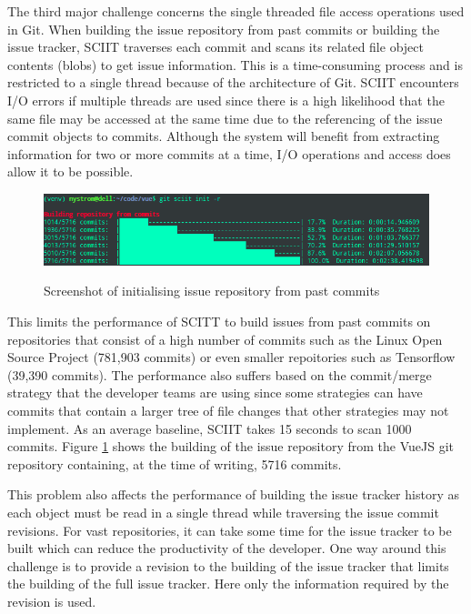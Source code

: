 \documentclass{mproj}
\begin{document}
The third major challenge concerns the single threaded file access operations used in Git. When building the issue repository from past commits or building the issue tracker, SCIIT traverses each commit and scans its related file object contents (blobs) to get issue information. This is a time-consuming process and is restricted to a single thread because of the architecture of Git. SCIIT encounters I/O errors if multiple threads are used since there is a high likelihood that the same file may be accessed at the same time due to the referencing of the issue commit objects to commits. Although the system will benefit from extracting information for two or more commits at a time, I/O operations and access does allow it to be possible. 

\begin{figure}[t]
\centering
  \caption{Screenshot of initialising issue repository from past commits}
  \includegraphics[width=14cm]{sciit-init}
  \label{fig:sciit-init}
\end{figure}

This limits the performance of SCITT to build issues from past commits on repositories that consist of a high number of commits such as the Linux Open Source Project (781,903 commits) or even smaller repoitories such as Tensorflow (39,390 commits). The performance also suffers based on the commit/merge strategy that the developer teams are using since some strategies can have commits that contain a larger tree of file changes that other strategies may not implement. As an average baseline, SCIIT takes 15 seconds to scan 1000 commits. Figure \ref{fig:sciit-init} shows the building of the issue repository from the VueJS git repository containing, at the time of writing, 5716 commits.

This problem also affects the performance of building the issue tracker history as each object must be read in a single thread while traversing the issue commit revisions. For vast repositories, it can take some time for the issue tracker to be built which can reduce the productivity of the developer. One way around this challenge is to provide a revision to the building of the issue tracker that limits the building of the full issue tracker. Here only the information required by the revision is used.
\end{document}
